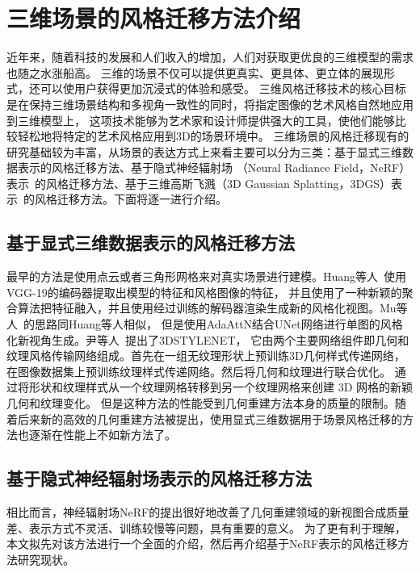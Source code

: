 \section{三维场景的风格迁移方法介绍}
近年来，随着科技的发展和人们收入的增加，人们对获取更优良的三维模型的需求也随之水涨船高。
三维的场景不仅可以提供更真实、更具体、更立体的展现形式，还可以使用户获得更加沉浸式的体验和感受。
三维风格迁移技术的核心目标是在保持三维场景结构和多视角一致性的同时，将指定图像的艺术风格自然地应用到三维模型上，
这项技术能够为艺术家和设计师提供强大的工具，使他们能够比较轻松地将特定的艺术风格应用到3D的场景环境中。
三维场景的风格迁移现有的研究基础较为丰富，从场景的表达方式上来看主要可以分为三类：基于显式三维数据表示的风格迁移方法、基于隐式神经辐射场
（Neural Radiance Field，NeRF）表示~\cite{mildenhall2021nerf}的风格迁移方法、基于三维高斯飞溅（3D Gaussian Splatting，3DGS）表示~\cite{kerbl20233d}的风格迁移方法。下面将逐一进行介绍。


\subsection{基于显式三维数据表示的风格迁移方法}
最早的方法是使用点云或者三角形网格来对真实场景进行建模。Huang等人~\cite{huang2021learning}使用VGG-19的编码器提取出模型的特征和风格图像的特征，
并且使用了一种新颖的聚合算法把特征融入，并且使用经过训练的解码器渲染生成新的风格化视图。Mu等人~\cite{mu20223d}的思路同Huang等人相似，
但是使用AdaAttN结合UNet网络进行单图的风格化新视角生成。尹等人~\cite{yin20213dstylenet}提出了3DSTYLENET，
它由两个主要网络组件即几何和纹理风格传输网络组成。首先在一组无纹理形状上预训练3D几何样式传递网络，
在图像数据集上预训练纹理样式传递网络。然后将几何和纹理进行联合优化。 
通过将形状和纹理样式从一个纹理网格转移到另一个纹理网格来创建 3D 网格的新颖几何和纹理变化。
但是这种方法的性能受到几何重建方法本身的质量的限制。随着后来新的高效的几何重建方法被提出，使用显式三维数据用于场景风格迁移的方法也逐渐在性能上不如新方法了。
\subsection{基于隐式神经辐射场表示的风格迁移方法}
相比而言，神经辐射场NeRF的提出很好地改善了几何重建领域的新视图合成质量差、表示方式不灵活、训练较慢等问题，具有重要的意义。
为了更有利于理解，本文拟先对该方法进行一个全面的介绍，然后再介绍基于NeRF表示的风格迁移方法研究现状。


